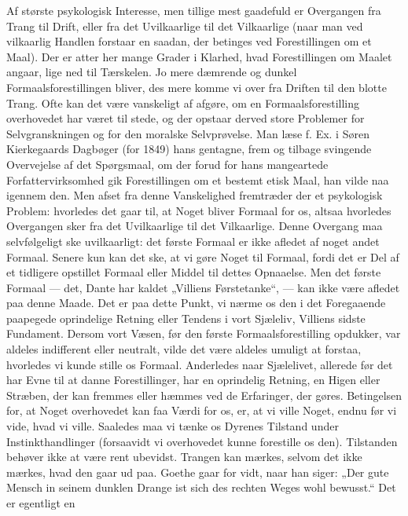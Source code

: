 \documentclass[12pt,a4paper,openany]{book}
\newcommand{\opage}[1]{\marginnote{\footnotesize\textit{[#1]}}}
\begin{document}
Af største psykologisk Interesse, men tillige mest gaadefuld
er Overgangen fra Trang til Drift, eller fra det Uvilkaarlige til
det Vilkaarlige (naar man ved vilkaarlig Handlen forstaar en
saadan, der betinges ved Forestillingen om et Maal). Der er
atter her mange Grader i Klarhed, hvad Forestillingen om
Maalet angaar, lige ned til Tærskelen. Jo mere dæmrende og
dunkel Formaalsforestillingen bliver, des mere komme vi over
fra Driften til den blotte Trang. Ofte kan det være vanskeligt
af afgøre, om en Formaalsforestilling overhovedet har været til
stede, og der opstaar derved store Problemer for Selvgranskningen
og for den moralske Selvprøvelse. Man læse f. Ex. i
Søren Kierkegaards Dagbøger (for 1849) hans gentagne, frem
og tilbage svingende Overvejelse af det Spørgsmaal, om der
forud for hans mangeartede Forfattervirksomhed gik Forestillingen
om et bestemt etisk Maal, han vilde naa igennem den.
Men afset fra denne Vanskelighed fremtræder der et psykologisk
Problem: hvorledes det gaar til, at Noget bliver Formaal
for os, altsaa hvorledes Overgangen sker fra det Uvilkaarlige
til det Vilkaarlige. Denne Overgang maa selvfølgeligt ske uvilkaarligt:
det første Formaal er ikke afledet af noget andet Formaal.
Senere kun kan det ske, at vi gøre Noget til Formaal,
fordi det er Del af et tidligere opstillet Formaal eller Middel
til dettes Opnaaelse. Men det første Formaal --- det, Dante
har kaldet „Villiens Førstetanke“, --- kan ikke være afledet paa
denne Maade. Det er paa dette Punkt, vi nærme os den i det
Foregaaende paapegede oprindelige Retning eller Tendens i vort
Sjæleliv, Villiens sidste Fundament. Dersom vort Væsen, før
\setcounter{footnote}{0}%
\opage{38}den første Formaalsforestilling opdukker, var aldeles indifferent
eller neutralt, vilde det være aldeles umuligt at forstaa, hvorledes
vi kunde stille os Formaal. Anderledes naar Sjælelivet,
allerede før det har Evne til at danne Forestillinger, har en
oprindelig Retning, en Higen eller Stræben, der kan fremmes
eller hæmmes ved de Erfaringer, der gøres. Betingelsen for,
at Noget overhovedet kan faa Værdi for os, er, at vi ville
Noget, endnu før vi vide, hvad vi ville. Saaledes maa vi
tænke os Dyrenes Tilstand under Instinkthandlinger (forsaavidt
vi overhovedet kunne forestille os den). Tilstanden behøver
ikke at være rent ubevidst. Trangen kan mærkes, selvom det
ikke mærkes, hvad den gaar ud paa. Goethe gaar for vidt,
naar han siger: „Der gute Mensch in seinem dunklen Drange
ist sich des rechten Weges wohl bewusst.“ Det er egentligt en
\end{document}
